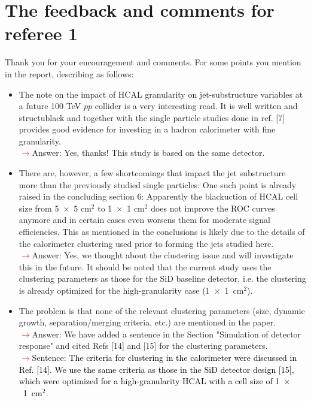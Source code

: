 \documentclass[final,1p,11pt]{elsarticle}
\begin{document}
\section{The feedback and comments for referee 1}
Thank you for your encouragement and comments. For some points you mention in the report, describing as follows:\\
\begin{itemize}
\item The note on the impact of HCAL granularity on jet-substructure variables at a future 100 TeV $pp$ collider is a very interesting read. It is well written and structublack and together with the single particle studies done in ref. [7] provides good evidence for investing in a hadron calorimeter with fine granularity.\\
\textcolor{red}{$\rightarrow$}Answer: Yes, thanks! This study is based on the same detector. 
\item There are, however, a few shortcomings that impact the jet substructure more than the previously studied single particles: One such point is already raised in the concluding section 6: Apparently the blackuction of HCAL cell size from 5~$\times$~5 cm$^2$ to 1~$\times$~1 cm$^2$ does not improve the ROC curves anymore and in certain cases even worsens them for moderate signal efficiencies. This as mentioned in the conclusions is likely due to the details of the calorimeter clustering used prior to forming the jets studied here.\\
 \textcolor{red}{$\rightarrow$}Answer: Yes, we thought about the clustering issue and will investigate this in
the future. It should be noted that the current study uses the clustering parameters
as those for the SiD baseline detector, i.e. the clustering is already optimized for the
high-granularity case (1~$\times$~1~cm$^2$). 
\item The problem is that none of the relevant clustering parameters (size, dynamic growth, separation/merging criteria, etc.) are mentioned in the paper.\\
 \textcolor{red}{$\rightarrow$}Answer: We have added a sentence  in the Section "Simulation of detector response" and cited Refs [14] and [15] for the clustering parameters.\\ 
 \textcolor{red}{$\rightarrow$}Sentence: \textcolor{black}{The criteria for clustering in the calorimeter were discussed in Ref. [14]. We use the same criteria as those in the SiD detector design [15], which were optimized for a high-granularity HCAL with a cell size of 1~$\times$~1~cm$^2$.}\\

\end{itemize}
\end{document}
